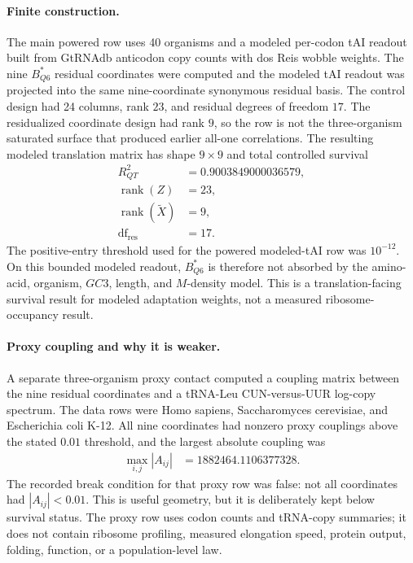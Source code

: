 \paragraph{Finite construction.}
The main powered row uses 40 organisms and a modeled per-codon tAI readout built from GtRNAdb anticodon copy counts with dos Reis wobble weights.  The nine $B^*_{Q6}$ residual coordinates were computed and the modeled tAI readout was projected into the same nine-coordinate synonymous residual basis.  The control design had 24 columns, rank $23$, and residual degrees of freedom $17$.  The residualized coordinate design had rank $9$, so the row is not the three-organism saturated surface that produced earlier all-one correlations.  The resulting modeled translation matrix has shape $9\times 9$ and total controlled survival
$$
\begin{aligned}
R^2_{QT} &= 0.9003849000036579,\\
\operatorname{rank}(Z) &= 23,\\
\operatorname{rank}(\widetilde X) &= 9,\\
\operatorname{df}_{\mathrm{res}} &= 17.
\end{aligned}
$$
The positive-entry threshold used for the powered modeled-tAI row was $10^{-12}$.  On this bounded modeled readout, $B^*_{Q6}$ is therefore not absorbed by the amino-acid, organism, $GC3$, length, and $M$-density model.  This is a translation-facing survival result for modeled adaptation weights, not a measured ribosome-occupancy result.

\paragraph{Proxy coupling and why it is weaker.}
A separate three-organism proxy contact computed a coupling matrix between the nine residual coordinates and a tRNA-Leu CUN-versus-UUR log-copy spectrum.  The data rows were Homo sapiens, Saccharomyces cerevisiae, and Escherichia coli K-12.  All nine coordinates had nonzero proxy couplings above the stated $0.01$ threshold, and the largest absolute coupling was
$$
\begin{aligned}
\max_{i,j}|A_{ij}| &= 1882464.1106377328.
\end{aligned}
$$
The recorded break condition for that proxy row was false: not all coordinates had $|A_{ij}|<0.01$.  This is useful geometry, but it is deliberately kept below survival status.  The proxy row uses codon counts and tRNA-copy summaries; it does not contain ribosome profiling, measured elongation speed, protein output, folding, function, or a population-level law.

